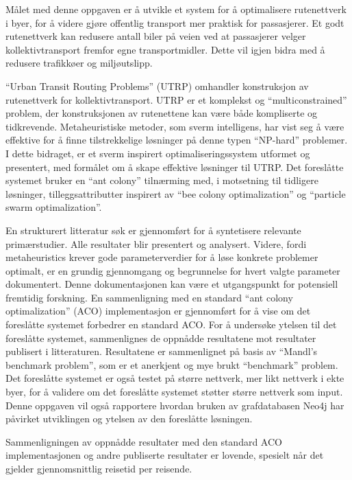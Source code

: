 Målet med denne oppgaven er å utvikle et system for å optimalisere rutenettverk i byer, for å videre gjøre offentlig transport mer praktisk for passasjerer. Et godt rutenettverk kan redusere antall biler på veien ved at passasjerer velger kollektivtransport fremfor egne transportmidler. Dette vil igjen bidra med å redusere trafikkøer og miljøutslipp.

``Urban Transit Routing Problems'' (UTRP) omhandler konstruksjon av rutenettverk for kollektivtransport. UTRP er et komplekst og ``multiconstrained'' problem, der konstruksjonen av rutenettene kan være både kompliserte og tidkrevende. Metaheuristiske metoder, som sverm intelligens, har vist seg å være effektive for å finne tilstrekkelige løsninger på denne typen ``NP-hard'' problemer. I dette bidraget, er et sverm inspirert optimaliseringssystem utformet og presentert, med formålet om å skape effektive løsninger til UTRP. Det foreslåtte systemet bruker en ``ant colony'' tilnærming med, i motsetning til tidligere løsninger, tilleggsattributter inspirert av ``bee colony optimalization'' og ``particle swarm optimalization''.

En strukturert litteratur søk er gjennomført for å syntetisere relevante primærstudier. Alle resultater blir presentert og analysert. Videre, fordi metaheuristics krever gode parameterverdier for å løse konkrete problemer optimalt, er en grundig gjennomgang og begrunnelse for hvert valgte parameter dokumentert. Denne dokumentasjonen kan være et utgangspunkt for potensiell fremtidig forskning. En sammenligning med en standard ``ant colony optimalization'' (ACO) implementasjon er gjennomført for å vise om det foreslåtte systemet forbedrer en standard ACO. For å undersøke ytelsen til det foreslåtte systemet, sammenlignes de oppnådde resultatene mot resultater publisert i litteraturen. Resultatene er sammenlignet på basis av ``Mandl's benchmark problem'', som er et anerkjent og mye brukt ``benchmark'' problem. Det foreslåtte systemet er også testet på større nettverk, mer likt nettverk i ekte byer, for å validere om det foreslåtte systemet støtter større nettverk som input. Denne oppgaven vil også rapportere hvordan bruken av grafdatabasen Neo4j har påvirket utviklingen og ytelsen av den foreslåtte løsningen.

Sammenligningen av oppnådde resultater med den standard ACO implementasjonen og andre publiserte resultater er lovende, spesielt når det gjelder gjennomsnittlig reisetid per reisende.
